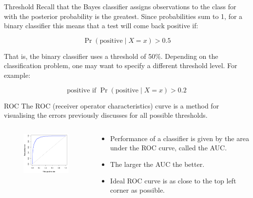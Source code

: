 \documentclass[
  ignorenonframetext,
  aspectratio=169,
]{beamer}
\begin{document}
\begin{frame}{Threshold}
\protect\hypertarget{threshold}{}
Recall that the Bayes classifier assigns observations to the class for
with the posterior probability is the greatest. Since probabilities sum
to 1, for a binary classifier this means that a test will come back
positive if:

\[
\operatorname{Pr}( \text{positive} \mid X=x) > 0.5
\]

That is, the binary classifier uses a threshold of 50\%. Depending on
the classification problem, one may want to specify a different
threshold level. For example:

\[
\text{positive if }\operatorname{Pr}( \text{positive} \mid X=x) > 0.2
\]
\end{frame}

\begin{frame}{ROC}
\protect\hypertarget{roc}{}
The ROC (receiver operator characteristics) curve is a method for
visualising the errors previously discusses for all possible thresholds.

\begin{columns}[T]
\begin{column}{0.5\textwidth}
\begin{figure}

{\centering \includegraphics[width=2.38542in,height=\textheight]{images/ROC.png}

}

\end{figure}
\end{column}

\begin{column}{0.5\textwidth}
\begin{itemize}
\item
  Performance of a classifier is given by the area under the ROC curve,
  called the AUC.
\item
  The larger the AUC the better.
\item
  Ideal ROC curve is as close to the top left corner as possible.
\end{itemize}
\end{column}
\end{columns}
\end{frame}
\end{document}
